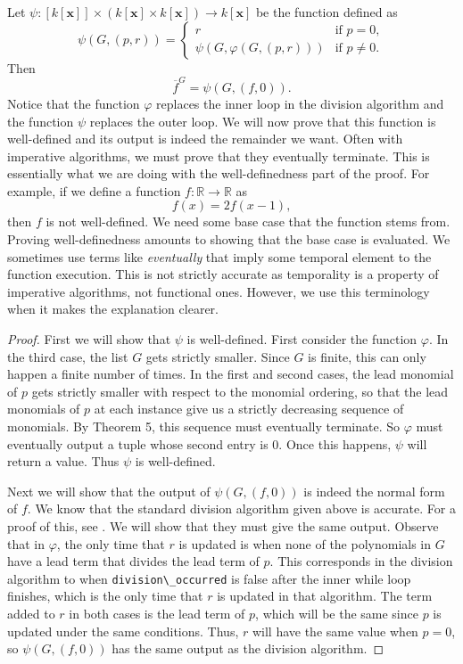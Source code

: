\documentclass[MS, xcolor=dvipsnames]{wfuthesis}
\def\bR{\mathbb{R}}
\theoremstyle{definition}
\def\p{\varphi}
\begin{document}
Let $\psi: [k[\mathbf x]] \times \left( k[\mathbf x] \times k[\mathbf x] \right) \to k[\mathbf x]$ be the function defined as
\[ \psi(G,(p,r)) = \begin{cases} r &\text{if } p = 0, \\ \psi(G,\p(G,(p,r))) &\text{if } p \ne 0. \end{cases} \]
Then
\[ \overline f^{G} = \psi(G,(f,0)). \]
Notice that the function $\p$ replaces the inner loop in the division algorithm and the function $\psi$ replaces the outer loop. We will now prove that this function is well-defined and its output is indeed the remainder we want. Often with imperative algorithms, we must prove that they eventually terminate. This is essentially what we are doing with the well-definedness part of the proof. For example, if we define a function $f: \bR \to \bR$ as
\[ f(x) = 2f(x-1), \]
then $f$ is not well-defined. We need some base case that the function stems from. Proving well-definedness amounts to showing that the base case is evaluated. We sometimes use terms like \emph{eventually} that imply some temporal element to the function execution. This is not strictly accurate as temporality is a property of imperative algorithms, not functional ones. However, we use this terminology when it makes the explanation clearer.
\begin{proof}
  First we will show that $\psi$ is well-defined. First consider the function $\p$. In the third case, the list $G$ gets strictly smaller. Since $G$ is finite, this can only happen a finite number of times. In the first and second cases, the lead monomial of $p$ gets strictly smaller with respect to the monomial ordering, so that the lead monomials of $p$ at each instance give us a strictly decreasing sequence of monomials. By Theorem 5, this sequence must eventually terminate. So $\p$ must eventually output a tuple whose second entry is 0. Once this happens, $\psi$ will return a value. Thus $\psi$ is well-defined. \par
  Next we will show that the output of $\psi(G,(f,0))$ is indeed the normal form of $f$. We know that the standard division algorithm given above is accurate. For a proof of this, see \cite{Cox2015}. We will show that they must give the same output. Observe that in $\p$, the only time that $r$ is updated is when none of the polynomials in $G$ have a lead term that divides the lead term of $p$. This corresponds in the division algorithm to when \lstinline{division\_occurred} is false after the inner while loop finishes, which is the only time that $r$ is updated in that algorithm. The term added to $r$ in both cases is the lead term of $p$, which will be the same since $p$ is updated under the same conditions. Thus, $r$ will have the same value when $p=0$, so $\psi(G,(f,0))$ has the same output as the division algorithm.
\end{proof}
\end{document}
